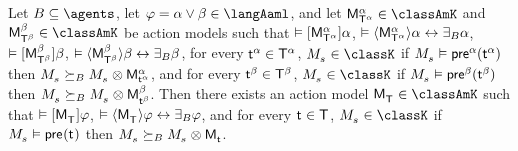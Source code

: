 \begin{lemma}\label{aaml-k-choice}
Let $\agentsB \subseteq \agents$, 
let $\phi = \alpha \lor \beta \in \langAaml$, and 
let $\aPModel[\alpha]{\aStatesT[\alpha]} \in \classAmK$ and $\aPModel[\beta]{\aStatesT[\beta]} \in \classAmK$ be action models such that 
$\entails \actionA{\aPModel[\alpha]{\aStatesT[\alpha]}} \alpha$, 
$\entails \actionE{\aPModel[\alpha]{\aStatesT[\alpha]}} \alpha \iff \someactsBs \alpha$, 
$\entails \actionA{\aPModel[\beta]{\aStatesT[\beta]}} \beta$,
$\entails \actionE{\aPModel[\beta]{\aStatesT[\beta]}} \beta \iff \someactsBs \beta$,
for every $\aStateT[\alpha] \in \aStatesT[\alpha]$, $\kPModel{\kStateS} \in \classK$ if $\kPModel{\kStateS} \entails \aPrecondition[\alpha](\aStateT[\alpha])$ then $\kPModel{\kStateS} \simulatesBs \kPModel{\kStateS} \exec \aPModel[\alpha]{\aStateT[\alpha]}$, and
for every $\aStateT[\beta] \in \aStatesT[\beta]$, $\kPModel{\kStateS} \in \classK$ if $\kPModel{\kStateS} \entails \aPrecondition[\beta](\aStateT[\beta])$ then $\kPModel{\kStateS} \simulatesBs \kPModel{\kStateS} \exec \aPModel[\beta]{\aStateT[\beta]}$.
Then there exists an action model $\aPModel{\aStatesT} \in \classAmK$ such that 
$\entails \actionA{\aPModel{\aStatesT}} \phi$,
$\entails \actionE{\aPModel{\aStatesT}} \phi \iff \someactsBs \phi$, and
for every $\aStateT \in \aStatesT$, $\kPModel{\kStateS} \in \classK$ if $\kPModel{\kStateS} \entails \aPrecondition(\aStateT)$ then $\kPModel{\kStateS} \simulatesBs \kPModel{\kStateS} \exec \aPModel{\aStateT}$.
\end{lemma}

